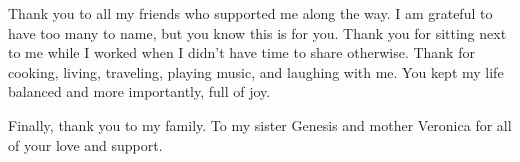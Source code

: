 Thank you to all my friends who supported me along the way. I am grateful to have too many to name, but you know this is for you. Thank you for sitting next to me while I worked when I didn't have time to share otherwise. Thank for cooking, living, traveling, playing music, and laughing with me. You kept my life balanced and more importantly, full of joy. 

Finally, thank you to my family. To my sister Genesis and mother Veronica for all of your love and support.


\restoregeometry

